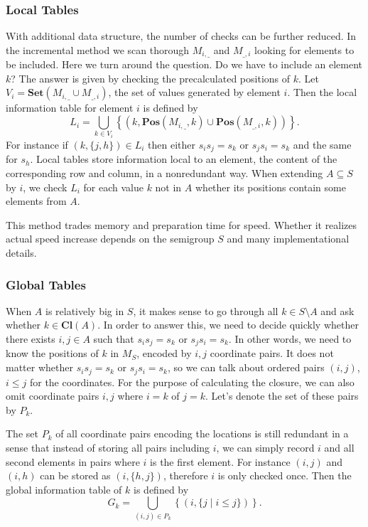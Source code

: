 \documentclass{amsart}
\newcommand{\Set}{\mathbf{Set}}
\newcommand{\Closure}{\mathbf{Cl}}
\newcommand{\Pos}{\mathbf{Pos}}
\theoremstyle{plain}
\theoremstyle{definition}
\begin{document}
\subsubsection{Local Tables}
With additional data structure, the number of checks can be further reduced. 
In the incremental method we scan thorough $M_{i,\_}$ and $M_{\_,i}$ looking for elements to be included.
Here we turn around the question.
Do we have to include an element $k$?
The answer is given by checking the precalculated positions of $k$. 
Let $V_i=\Set(M_{i,\_}\cup M_{\_,i})$, the set of values generated by element $i$.
Then the  local information table for element $i$ is defined by
$$L_i=\bigcup_{k\in V_i}\left\{(k,\Pos(M_{i,\_},k)\cup\Pos(M_{\_,i},k))\right\}.$$
For instance if $(k,\{j,h\})\in L_i$ then either $s_is_j=s_k$ or $s_js_i=s_k$ and the same for $s_h$.
Local tables store information local to an element, the content of the corresponding row and column, in a nonredundant way.
When  extending $A\subseteq S$ by $i$, we check $L_i$ for each value $k$ not in $A$ whether its positions contain some elements from $A$. 

This method trades memory and preparation time for speed. Whether it realizes actual speed increase depends on the semigroup $S$ and many implementational details.

\subsubsection{Global Tables}
When $A$ is relatively big in $S$, it makes sense to go through all $k\in S\setminus A$ and ask whether $k\in\Closure(A)$. 
In order to answer this, we need to decide quickly whether there exists $i,j\in A$ such that $s_is_j=s_k$ or $s_js_i=s_k$.
In other words, we need to know the positions of $k$ in $M_S$, encoded by $i,j$ coordinate pairs.
It does not matter whether $s_is_j=s_k$ or $s_js_i=s_k$, so we can talk about ordered pairs $(i,j)$, $i\leq j$ for the coordinates. 
For the purpose of calculating the closure, we can also omit coordinate pairs $i,j$ where $i=k$ of $j=k$. 
Let's denote the set of these pairs by $P_k$.

The set $P_k$ of all coordinate pairs encoding the locations is still redundant in a sense that instead of storing all pairs including $i$, we can simply record $i$ and all second  elements in  pairs where $i$ is the first element.
For instance $(i,j)$ and $(i,h)$ can be stored as $(i,\{h,j\})$, therefore $i$ is only checked once.
Then the  global information table of $k$ is defined by
$$G_k=\bigcup_{(i,j)\in P_k} \left\{ (i,\{j\mid i\leq j\})\right\}.$$
\end{document}
